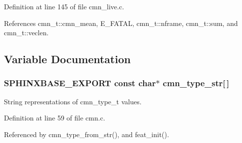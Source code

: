 Definition at line 145 of file cmn\-\_\-live.\-c.



References cmn\-\_\-t\-::cmn\-\_\-mean, E\-\_\-\-F\-A\-T\-A\-L, cmn\-\_\-t\-::nframe, cmn\-\_\-t\-::sum, and cmn\-\_\-t\-::veclen.



\subsection{Variable Documentation}
\subsubsection[{cmn\-\_\-type\-\_\-str}]{\setlength{\rightskip}{0pt plus 5cm}S\-P\-H\-I\-N\-X\-B\-A\-S\-E\-\_\-\-E\-X\-P\-O\-R\-T const char$\ast$ cmn\-\_\-type\-\_\-str[$\,$]}\label{cmn_8h_ae2ab0bad7168386076c43fc2a421867f}


String representations of cmn\-\_\-type\-\_\-t values. 



Definition at line 59 of file cmn.\-c.



Referenced by cmn\-\_\-type\-\_\-from\-\_\-str(), and feat\-\_\-init().

